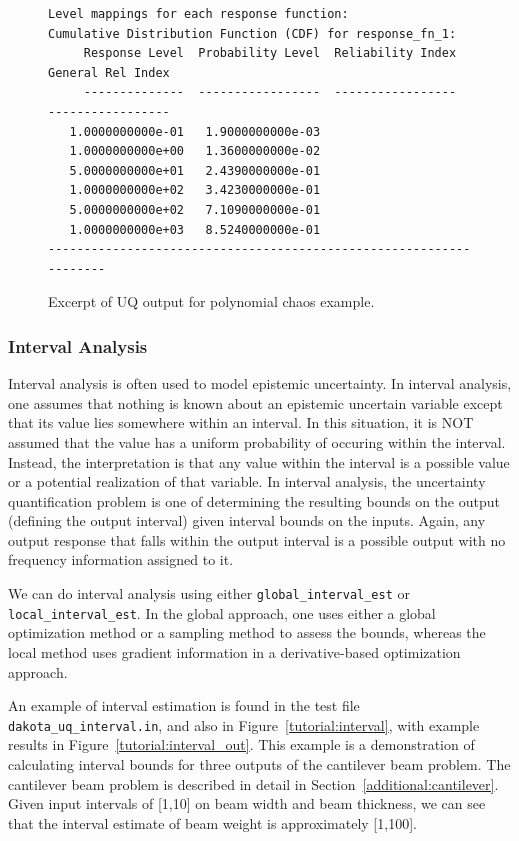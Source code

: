 \begin{figure}
\begin{bigbox}
\begin{scriptsize}
\begin{verbatim}
Level mappings for each response function:
Cumulative Distribution Function (CDF) for response_fn_1:
     Response Level  Probability Level  Reliability Index  General Rel Index
     --------------  -----------------  -----------------  -----------------
   1.0000000000e-01   1.9000000000e-03
   1.0000000000e+00   1.3600000000e-02
   5.0000000000e+01   2.4390000000e-01
   1.0000000000e+02   3.4230000000e-01
   5.0000000000e+02   7.1090000000e-01
   1.0000000000e+03   8.5240000000e-01
-------------------------------------------------------------------
\end{verbatim}
\end{scriptsize}
\end{bigbox}
\caption{Excerpt of UQ output for polynomial chaos example.}
\label{tutorial:pce_out}
\end{figure}

\subsubsection{Interval Analysis}\label{tutorial:example:uncert_quant:interval}

Interval analysis is often used to model epistemic uncertainty. 
In interval analysis, one assumes that nothing is known about 
an epistemic uncertain variable except that its value lies 
somewhere within an interval.  In this situation, it is NOT 
assumed that the value has a uniform probability of occuring 
within the interval.  Instead, the interpretation is that 
any value within the interval is a possible value or a potential 
realization of that variable.  In interval analysis, the 
uncertainty quantification problem is one of determining the 
resulting bounds on the output (defining the output interval) 
given interval bounds on the inputs. Again, any output response 
that falls within the output interval is a possible output 
with no frequency information assigned to it.

We can do interval analysis using either
\texttt{global\_interval\_est} or \texttt{local\_interval\_est}.
In the global approach, one uses either a global optimization 
method or a sampling method to assess the bounds, whereas the 
local method uses gradient information in a derivative-based 
optimization approach. 
 
An example of interval estimation 
is found in the test file \texttt{dakota\_uq\_interval.in}, 
and also in Figure~\ref{tutorial:interval}, with example results in 
Figure~\ref{tutorial:interval_out}. This example is a demonstration 
of calculating interval bounds for three outputs of the cantilever beam 
problem. The cantilever beam problem is described in detail in 
Section~\ref{additional:cantilever}. Given input intervals of [1,10] on 
beam width and beam thickness, we can see that the interval estimate of 
beam weight is approximately [1,100].

